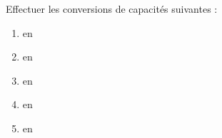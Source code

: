 \begin{exercice*}
   Effectuer les conversions de capacités suivantes :
   \begin{enumerate}
      \item {}      en \Capa[dL]{}
      \item {} en \Capa[cL]{}
      \item {}    en \Capa[L]{} 
      \item {}    en \Capa[daL]{}
      \item {} en \Capa[dL]{} 
   \end{enumerate}
\end{exercice*}
